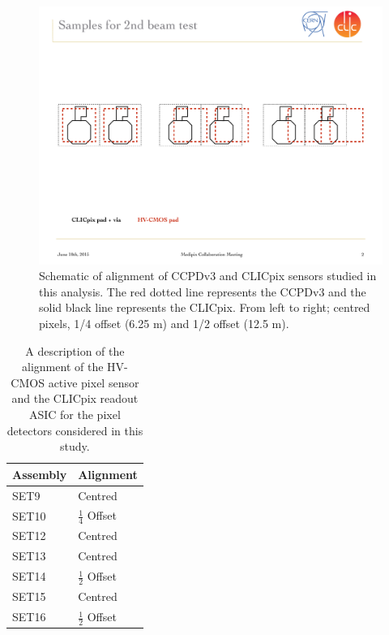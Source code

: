 \begin{figure}
\centering
\includegraphics[width=1.0\textwidth]{CLICdpVertex/Plots/misalignedPads.pdf}
\caption[Schematic of alignment of CCPDv3 and CLICpix sensors studied in this analysis.]{Schematic of alignment of CCPDv3 and CLICpix sensors studied in this analysis.  The red dotted line represents the CCPDv3 and the solid black line represents the CLICpix.  From left to right; centred pixels, 1/4 offset (6.25 {\mu}m) and 1/2 offset (12.5 {\mu}m).}
\label{fig:alignment}
\end{figure}

\begin{table}[h!]
\centering
\begin{tabular}{ l l }
\hline
Assembly & Alignment \\ 
\hline
SET9 & Centred \\
SET10 & $\frac{1}{4}$ Offset \\
SET12 & Centred \\
SET13 & Centred \\
SET14 & $\frac{1}{2}$ Offset \\
SET15 & Centred \\
SET16 & $\frac{1}{2}$ Offset \\
\hline
\end{tabular}
\caption[A description of the alignment of the HV-CMOS active pixel sensor and the CLICpix readout ASIC for the pixel detectors considered in this study.]{A description of the alignment of the HV-CMOS active pixel sensor and the CLICpix readout ASIC for the pixel detectors considered in this study.}
\label{table:alignment}
\end{table}

